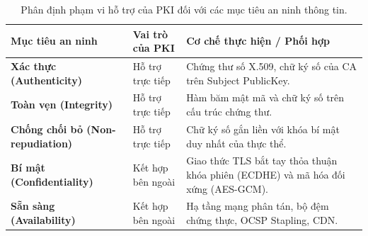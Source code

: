 \begin{table}[!htbp]
\centering
\small
\renewcommand{\arraystretch}{1.3}
\begin{tabular}{>{\raggedright\arraybackslash}p{3.5cm}>{\raggedright\arraybackslash}p{2.6cm}>{\raggedright\arraybackslash}p{8.5cm}}
\toprule
\textbf{Mục tiêu an ninh} & \textbf{Vai trò của PKI} & \textbf{Cơ chế thực hiện / Phối hợp} \\
\midrule
\textbf{Xác thực (Authenticity)} & Hỗ trợ trực tiếp & Chứng thư số X.509, chữ ký số của CA trên Subject PublicKey. \\
\midrule
\textbf{Toàn vẹn (Integrity)} & Hỗ trợ trực tiếp & Hàm băm mật mã và chữ ký số trên cấu trúc chứng thư. \\
\midrule
\textbf{Chống chối bỏ (Non-repudiation)} & Hỗ trợ trực tiếp & Chữ ký số gắn liền với khóa bí mật duy nhất của thực thể. \\
\midrule
\textbf{Bí mật (Confidentiality)} & Kết hợp bên ngoài & Giao thức TLS bắt tay thỏa thuận khóa phiên (ECDHE) và mã hóa đối xứng (AES-GCM). \\
\midrule
\textbf{Sẵn sàng (Availability)} & Kết hợp bên ngoài & Hạ tầng mạng phân tán, bộ đệm chứng thực, OCSP Stapling, CDN. \\
\bottomrule
\end{tabular}
\caption[Phân định phạm vi hỗ trợ của PKI đối với mục tiêu an ninh thông tin]{Phân định phạm vi hỗ trợ của PKI đối với các mục tiêu an ninh thông tin.}
\label{tab:pki-security-goals}
\end{table}
